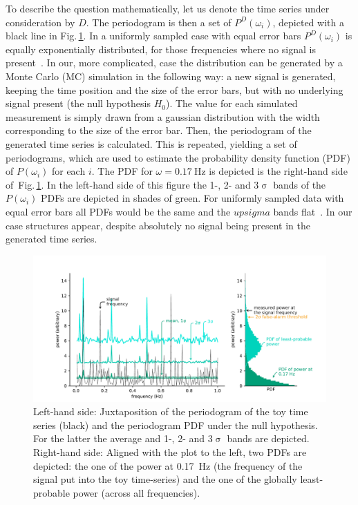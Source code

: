 To describe the question mathematically, let us denote the time series under consideration by $D$. The periodogram is then a set of $P^D(\omega_i)$, depicted with a black line in Fig.\,\ref{fig:basic_detection}. In a uniformly sampled case with equal error bars $P^D(\omega_i)$ is equally exponentially distributed, for those frequencies where no signal is present~\cite{Scargle1982}. In our, more complicated, case the distribution can be generated by a Monte Carlo (MC) simulation in the following way: a new signal is generated, keeping the time position and the size of the error bars, but with no underlying signal present (the null hypothesis $H_0$). The value for each simulated measurement is simply drawn from a gaussian distribution with the width corresponding to the size of the error bar. Then, the periodogram of the generated time series is calculated. This is repeated, yielding a set of periodograms, which are used to estimate the probability density function (PDF) of $P(\omega_i)$ for each $i$. The PDF for $\omega = \SI{0.17}{\hertz}$ is depicted is the right-hand side of~Fig.\,\ref{fig:basic_detection}. In the left-hand side of this figure the 1-, 2- and 3$\upsigma$ bands of the $P(\omega_i)$ PDFs are depicted in shades of green. For uniformly sampled data with equal error bars all PDFs would be the same and the $upsigma$ bands flat~\cite{Scargle1982}. In our case structures appear, despite absolutely no signal being present in the generated time series.

\begin{figure}
  \centering \includegraphics[width=\linewidth]{gfx/axions/basic_detection.pdf}
  \caption{Left-hand side: Juxtaposition of the periodogram of the toy time series (black) and the periodogram PDF under the null hypothesis. For the latter the average and 1-, 2- and 3$\upsigma$ bands are depicted. Right-hand side: Aligned with the plot to the left, two PDFs are depicted: the one of the power at \SI{0.17}{\hertz} (the frequency of the signal put into the toy time-series) and the one of the globally least-probable power (across all frequencies).}
  \label{fig:basic_detection}
\end{figure}

